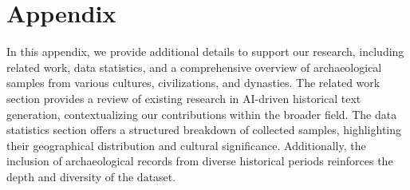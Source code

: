 \documentclass[11pt]{article}
\begin{document}


\clearpage
\appendix

\section{Appendix}
\label{sec:appendix}

In this appendix, we provide additional details to support our research, including related work, data statistics, and a comprehensive overview of archaeological samples from various cultures, civilizations, and dynasties. The related work section provides a review of existing research in AI-driven historical text generation, contextualizing our contributions within the broader field.  The data statistics section offers a structured breakdown of collected samples, highlighting their geographical distribution and cultural significance. Additionally, the inclusion of archaeological records from diverse historical periods reinforces the depth and diversity of the dataset. 
\end{document}

